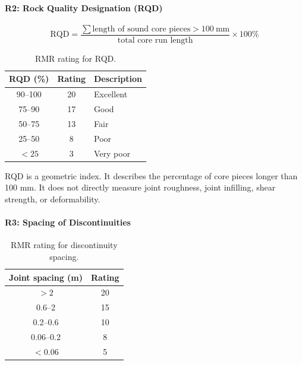 \paragraph{R2: Rock Quality Designation (RQD)}

\[
\text{RQD} =
\frac{
\sum \text{length of sound core pieces} > 100~\text{mm}
}
{\text{total core run length}}
\times 100\%
\]

\begin{table}[H]
\centering
\small
\begin{tabular}{c c l}
\toprule
\textbf{RQD (\%)} & \textbf{Rating} & \textbf{Description} \\
\midrule
90--100 & 20 & Excellent \\
75--90 & 17 & Good \\
50--75 & 13 & Fair \\
25--50 & 8 & Poor \\
\(<25\) & 3 & Very poor \\
\bottomrule
\end{tabular}
\caption{RMR rating for RQD.}
\label{tab:rmr_rqd}
\end{table}

\begin{warnbox}
RQD is a geometric index. It describes the percentage of core pieces longer than
100 mm. It does not directly measure joint roughness, joint infilling, shear strength,
or deformability.
\end{warnbox}

\paragraph{R3: Spacing of Discontinuities}

\begin{table}[H]
\centering
\small
\begin{tabular}{c c}
\toprule
\textbf{Joint spacing (m)} & \textbf{Rating} \\
\midrule
\(>2\) & 20 \\
0.6--2 & 15 \\
0.2--0.6 & 10 \\
0.06--0.2 & 8 \\
\(<0.06\) & 5 \\
\bottomrule
\end{tabular}
\caption{RMR rating for discontinuity spacing.}
\label{tab:rmr_spacing}
\end{table}

